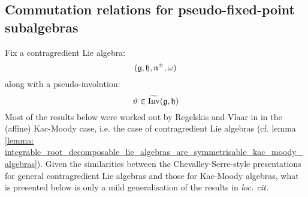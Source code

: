     \subsection{Commutation relations for pseudo-fixed-point subalgebras} \label{subsection: commutation_relations_for_pseudo_fixed_point_subalgebras}
        Fix a contragredient Lie algebra:
            $$(\mathfrak{g}, \mathfrak{h}, \mathfrak{n}^{\pm}, \omega)$$
        along with a pseudo-involution:
            $$\vartheta \in \widetilde{\operatorname{Inv}}(\mathfrak{g}, \mathfrak{h})$$
        Most of the results below were worked out by Regelskis and Vlaar in \cite[Section 3]{regelskis_vlaar_kac_moody_pseudo_symmetric_pairs} in the (affine) Kac-Moody case, i.e. the case of  contragredient Lie algebras (cf. lemma \ref{lemma: integrable_root_decomposable_lie_algebras_are_symmetrisable_kac_moody_algebras}). Given the similarities between the Chevalley-Serre-style presentations for general contragredient Lie algebras and those for Kac-Moody algebras, what is presented below is only a mild generalisation of the results in \textit{loc. cit.}
    
